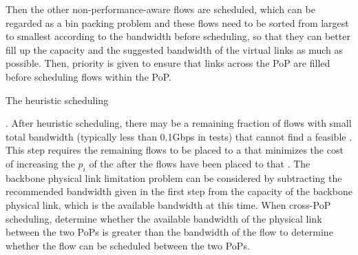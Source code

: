 {Then the other non-performance-aware flows are scheduled, which can be regarded as a bin packing problem and these flows need to be sorted from largest to smallest according to the bandwidth before scheduling, so that they can better fill up the {\egress} capacity and the suggested bandwidth of the virtual links as much as possible. Then, priority is given to ensure that links across the PoP are filled before scheduling flows within the PoP.}

{The heuristic scheduling }

{. After heuristic scheduling, there may be a remaining fraction of flows with small total bandwidth (typically less than 0.1Gbps in tests) that cannot find a feasible {\egress}. This step requires the remaining flows to be placed to a {\egress} that minimizes the cost of increasing the $p_i$ of the {\egress} after the flows have been placed to that {\egress}. The backbone physical link limitation problem can be considered by subtracting the recommended bandwidth given in the first step from the capacity of the backbone physical link, which is the available bandwidth at this time. When cross-PoP scheduling, determine whether the available bandwidth of the physical link between the two PoPs is greater than the bandwidth of the flow to determine whether the flow can be scheduled between the two PoPs.}





